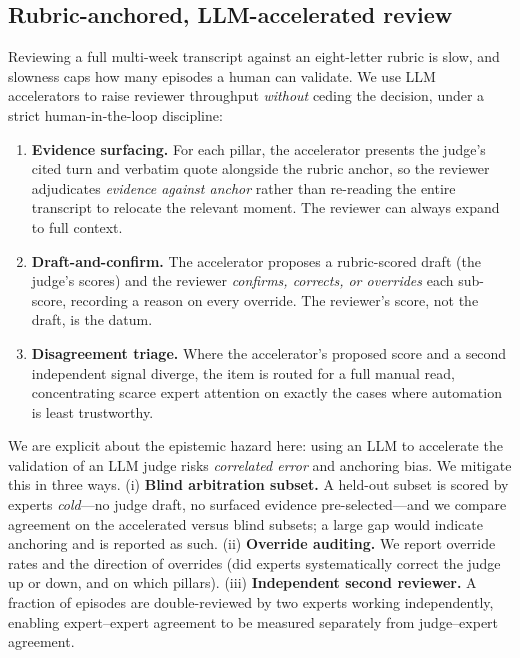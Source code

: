 \subsection{Rubric-anchored, LLM-accelerated review}
\label{sec:accelerators}
Reviewing a full multi-week transcript against an eight-letter rubric is slow, and
slowness caps how many episodes a human can validate. We use LLM accelerators to
raise reviewer throughput \emph{without} ceding the decision, under a strict
human-in-the-loop discipline:

\begin{enumerate}[leftmargin=1.4em,itemsep=2pt,topsep=2pt]
  \item \textbf{Evidence surfacing.} For each pillar, the accelerator presents the
  judge's cited turn and verbatim quote alongside the rubric anchor, so the
  reviewer adjudicates \emph{evidence against anchor} rather than re-reading the
  entire transcript to relocate the relevant moment. The reviewer can always
  expand to full context.
  \item \textbf{Draft-and-confirm.} The accelerator proposes a rubric-scored draft
  (the judge's scores) and the reviewer \emph{confirms, corrects, or overrides}
  each sub-score, recording a reason on every override. The reviewer's score, not
  the draft, is the datum.
  \item \textbf{Disagreement triage.} Where the accelerator's proposed score and a
  second independent signal diverge, the item is routed for a full manual read,
  concentrating scarce expert attention on exactly the cases where automation is
  least trustworthy.
\end{enumerate}

We are explicit about the epistemic hazard here: using an LLM to accelerate the
validation of an LLM judge risks \emph{correlated error} and anchoring bias. We
mitigate this in three ways. (i) \textbf{Blind arbitration subset.} A held-out
subset is scored by experts \emph{cold}---no judge draft, no surfaced evidence
pre-selected---and we compare agreement on the accelerated versus blind subsets;
a large gap would indicate anchoring and is reported as such. (ii)
\textbf{Override auditing.} We report override rates and the direction of
overrides (did experts systematically correct the judge up or down, and on which
pillars). (iii) \textbf{Independent second reviewer.} A fraction of episodes are
double-reviewed by two experts working independently, enabling expert--expert
agreement to be measured separately from judge--expert agreement.

